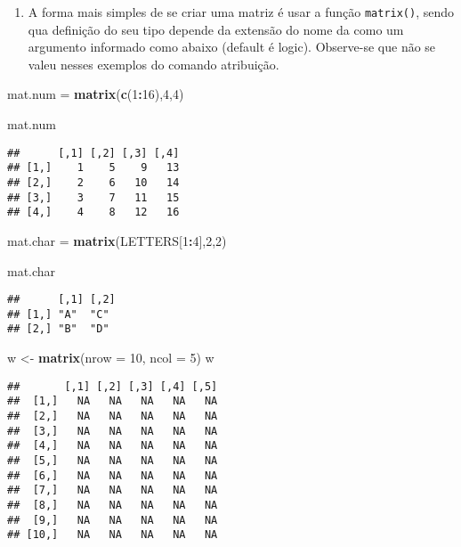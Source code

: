 \documentclass[]{article}
\newenvironment{Shaded}{\begin{snugshade}}{\end{snugshade}}
\newcommand{\KeywordTok}[1]{\textcolor[rgb]{0.13,0.29,0.53}{\textbf{#1}}}
\newcommand{\DataTypeTok}[1]{\textcolor[rgb]{0.13,0.29,0.53}{#1}}
\newcommand{\DecValTok}[1]{\textcolor[rgb]{0.00,0.00,0.81}{#1}}
\newcommand{\StringTok}[1]{\textcolor[rgb]{0.31,0.60,0.02}{#1}}
\newcommand{\OperatorTok}[1]{\textcolor[rgb]{0.81,0.36,0.00}{\textbf{#1}}}
\newcommand{\NormalTok}[1]{#1}
\providecommand{\tightlist}{%
  \setlength{\itemsep}{0pt}\setlength{\parskip}{0pt}}
\begin{document}
\begin{enumerate}
\def\labelenumi{\arabic{enumi}.}
\tightlist
\item
  A forma mais simples de se criar uma matriz é usar a função
  \texttt{matrix()}, sendo qua definição do seu tipo depende da extensão
  do nome da como um argumento informado como abaixo (default é logic).
  Observe-se que não se valeu nesses exemplos do comando atribuição.
\end{enumerate}

\begin{Shaded}
\begin{Highlighting}[]
\NormalTok{mat.num  =}\StringTok{ }\KeywordTok{matrix}\NormalTok{(}\KeywordTok{c}\NormalTok{(}\DecValTok{1}\OperatorTok{:}\DecValTok{16}\NormalTok{),}\DecValTok{4}\NormalTok{,}\DecValTok{4}\NormalTok{)}

\NormalTok{mat.num}
\end{Highlighting}
\end{Shaded}

\begin{verbatim}
##      [,1] [,2] [,3] [,4]
## [1,]    1    5    9   13
## [2,]    2    6   10   14
## [3,]    3    7   11   15
## [4,]    4    8   12   16
\end{verbatim}

\begin{Shaded}
\begin{Highlighting}[]
\NormalTok{mat.char =}\StringTok{ }\KeywordTok{matrix}\NormalTok{(LETTERS[}\DecValTok{1}\OperatorTok{:}\DecValTok{4}\NormalTok{],}\DecValTok{2}\NormalTok{,}\DecValTok{2}\NormalTok{)}

\NormalTok{mat.char}
\end{Highlighting}
\end{Shaded}

\begin{verbatim}
##      [,1] [,2]
## [1,] "A"  "C" 
## [2,] "B"  "D"
\end{verbatim}

\begin{Shaded}
\begin{Highlighting}[]
\NormalTok{w <-}\StringTok{ }\KeywordTok{matrix}\NormalTok{(}\DataTypeTok{nrow =} \DecValTok{10}\NormalTok{, }\DataTypeTok{ncol =} \DecValTok{5}\NormalTok{)}
\NormalTok{w}
\end{Highlighting}
\end{Shaded}

\begin{verbatim}
##       [,1] [,2] [,3] [,4] [,5]
##  [1,]   NA   NA   NA   NA   NA
##  [2,]   NA   NA   NA   NA   NA
##  [3,]   NA   NA   NA   NA   NA
##  [4,]   NA   NA   NA   NA   NA
##  [5,]   NA   NA   NA   NA   NA
##  [6,]   NA   NA   NA   NA   NA
##  [7,]   NA   NA   NA   NA   NA
##  [8,]   NA   NA   NA   NA   NA
##  [9,]   NA   NA   NA   NA   NA
## [10,]   NA   NA   NA   NA   NA
\end{verbatim}
\end{document}
